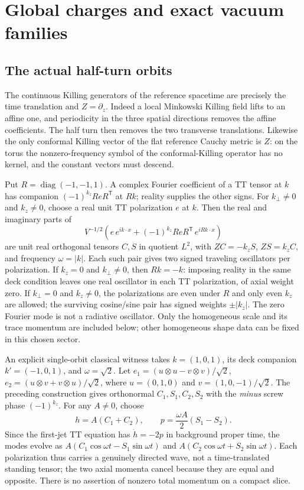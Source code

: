 \section{Global charges and exact vacuum families}\label{sec:classical}

\subsection{The actual half-turn orbits}

The continuous Killing generators of the reference spacetime are precisely the time translation and \(Z=\partial_z\). Indeed a local Minkowski Killing field lifts to an affine one, and periodicity in the three spatial directions removes the affine coefficients. The half turn then removes the two transverse translations. Likewise the only conformal Killing vector of the flat reference Cauchy metric is \(Z\): on the torus the nonzero-frequency symbol of the conformal-Killing operator has no kernel, and the constant vectors must descend.

Put \(R=\operatorname{diag}(-1,-1,1)\). A complex Fourier coefficient of a TT tensor at \(k\) has companion \((-1)^{k_z}ReR^{\mathsf T}\) at \(Rk\); reality supplies the other signs. For \(k_\perp\ne0\) and \(k_z\ne0\), choose a real unit TT polarization \(e\) at \(k\). Then the real and imaginary parts of
\[
 V^{-1/2}\left(e\, e^{ik\cdot x}
                    +(-1)^{k_z}ReR^{\mathsf T}\,e^{iRk\cdot x}\right)
\]
are unit real orthogonal tensors \(C,S\) in quotient \(L^2\), with
\(ZC=-k_zS\), \(ZS=k_zC\), and frequency \(\omega=|k|\). Each such pair gives two signed traveling oscillators per polarization. If \(k_z=0\) and \(k_\perp\ne0\), then \(Rk=-k\): imposing reality in the same deck condition leaves one real oscillator in each TT polarization, of axial weight zero. If \(k_\perp=0\) and \(k_z\ne0\), the polarizations are even under \(R\) and only even \(k_z\) are allowed; the surviving cosine/sine pair has signed weights \(\pm |k_z|\). The zero Fourier mode is not a radiative oscillator. Only the homogeneous scale and its trace momentum are included below; other homogeneous shape data can be fixed in this chosen sector.

An explicit single-orbit classical witness takes \(k=(1,0,1)\), its deck companion \(k'=(-1,0,1)\), and \(\omega=\sqrt2\). Let \(e_1=(u\otimes u-v\otimes v)/\sqrt2\), \(e_2=(u\otimes v+v\otimes u)/\sqrt2\), where \(u=(0,1,0)\) and \(v=(1,0,-1)/\sqrt2\). The preceding construction gives orthonormal \(C_1,S_1,C_2,S_2\) with the \emph{minus} screw phase \((-1)^{k_z}\). For any \(A\ne0\), choose
\begin{equation}\label{eq:travel}
     h=A(C_1+C_2),\qquad
     p=\frac{\omega A}{2}(S_1-S_2).
\end{equation}
Since the first-jet TT equation has \(\dot h=-2p\) in background proper time, the modes evolve as
\(A(C_1\cos\omega t-S_1\sin\omega t)\) and
\(A(C_2\cos\omega t+S_2\sin\omega t)\).
Each polarization thus carries a genuinely directed wave, not a time-translated standing tensor; the two axial momenta cancel because they are equal and opposite. There is no assertion of nonzero total momentum on a compact slice.

